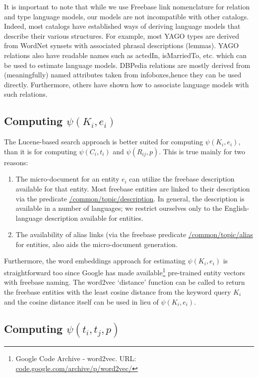 \documentclass[a4paper, twoside, 12pt]{report}
\begin{document}
It is important to note that while we use Freebase link nomenclature for relation and type language models, our models are not incompatible with other catalogs. Indeed, most catalogs have established ways of deriving language models that describe their various structures. For example, most YAGO types are derived from WordNet synsets with associated phrasal descriptions (lemmas). YAGO relations also have readable names such as actedIn, isMarriedTo, etc. which can be used to estimate language models. DBPedia relations are mostly derived from (meaningfully) named attributes taken from infoboxes,hence they can be used directly. Furthermore, others \cite{wu2007autonomously} have shown how to associate language models with such relations.


\subsection{Computing $\psi(K_i, e_i)$}
The Lucene-based search approach is better suited for computing $\psi(K_i, e_i)$, than it is for computing $\psi(C_i, t_i)$ and $\psi(R_{ij}, p)$. This is true mainly for two reasons:
\begin{enumerate}
\item The micro-document for an entity $e_i$ can utilize the freebase description available for that entity. Most freebase entities are linked to their description via the predicate \url{/common/topic/description}. In general, the description is available in a number of languages; we restrict ourselves only to the English-language description available for entities.
\item The availability of alias links (via the freebase predicate \url{/common/topic/alias} for entities, also aids the micro-document generation.
\end{enumerate}

Furthermore, the word embeddings approach for estimating $\psi(K_i,e_i)$ is straightforward too since Google has made available\footnote{Google Code Archive - word2vec. URL: \url{code.google.com/archive/p/word2vec/}} pre-trained entity vectors with freebase naming. The word2vec `distance' function can be called to return the freebase entities with the least cosine distance from the keyword query $K_i$ and the cosine distance itself can be used in lieu of $\psi(K_i,e_i)$. 

\subsection{Computing $\psi(t_i, t_j, p)$}
\end{document}
